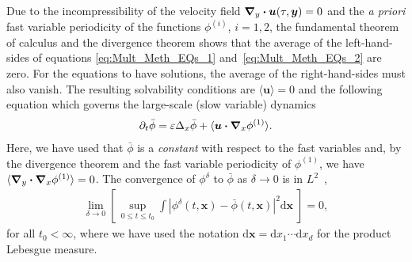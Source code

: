 \documentclass[leqno,onefignum,onetabnum]{siamltex1213}
\renewcommand{\d}{\mathrm{d}}
\newcommand\bnabla{\mbox{\boldmath${\nabla}$}}
\providecommand\bcdot{\boldsymbol{\cdot}}
\newcommand{\vecx}{\boldsymbol{x}}
\newcommand{\vecy}{\boldsymbol{y}}
\newcommand{\vecu}{\boldsymbol{u}}
\begin{document}
Due to the incompressibility of the velocity field
$\bnabla _y\bcdot\vecu (\tau,\vecy)=0$ and the \emph{a priori} fast variable
periodicity of the functions $\phi^{(i)}$, $i=1,2$,  the
fundamental theorem of calculus and the divergence theorem shows that
the average of the left-hand-sides of equations
\eqref{eq:Mult_Meth_EQs_1} and~\eqref{eq:Mult_Meth_EQs_2} are
zero. For the equations to have solutions, the average of the
right-hand-sides must also vanish.
The resulting solvability conditions are $\langle\vecu \rangle=0$
and the following equation which governs the large-scale (slow
variable) dynamics   
%
\begin{align}\label{eq:Avg_EQ_phi}
  \partial_t\bar{\phi}=\varepsilon\Delta_x\bar{\phi}+\langle\vecu \bcdot\bnabla _x\phi^{(1)}\rangle.
\end{align}
%
Here, we have used that $\bar{\phi}$ is a \emph{constant} with respect to
the fast variables and, by the divergence theorem and the fast
variable periodicity of $\phi^{(1)}$, we have
$\langle\bnabla _y\bcdot\bnabla _x\phi^{(1)}\rangle=0$. The convergence of $\phi^\delta$ to $\bar{\phi}$ as
$\delta\to0$ is in $L^2$~\cite{Fannjiang:SIAM_JAM:333},  
%
\begin{align}
  \lim_{\delta\to0}\left[\,\sup_{0\leq t\leq t_0}
    \int\left|\phi^\delta(t,\vecx)-\bar{\phi}(t,\vecx)\right|^2\d\vecx
    \;\right]=0,
\end{align}
%
for all $t_0<\infty$, where we have used the notation $\d\vecx=\d x_1\cdots \d
x_d$ for the product Lebesgue measure.
\end{document}
